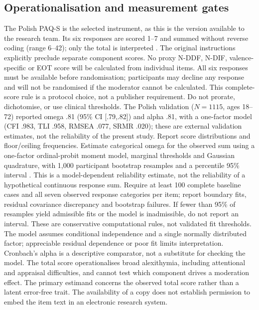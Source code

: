 \documentclass[11pt,a4paper]{article}
\begin{document}
\subsection{Operationalisation and measurement gates}
The Polish PAQ-S is the selected instrument, as this is the version available to the research team. Its six responses are scored 1--7 and summed without reverse coding (range 6--42); only the total is interpreted \parencite{preece2023,larionow2023,paqshortpl2023}. The original instructions explicitly preclude separate component scores. No proxy N-DDF, N-DIF, valence-specific or EOT score will be calculated from individual items. All six responses must be available before randomisation; participants may decline any response and will not be randomised if the moderator cannot be calculated. This complete-score rule is a protocol choice, not a publisher requirement. Do not prorate, dichotomise, or use clinical thresholds. The Polish validation (\(N=1115\), ages 18--72) reported omega .81 (95\% CI [.79,.82]) and alpha .81, with a one-factor model (CFI .983, TLI .958, RMSEA .077, SRMR .020); these are external validation estimates, not the reliability of the present study. Report score distributions and floor/ceiling frequencies. Estimate categorical omega for the observed sum using a one-factor ordinal-probit moment model, marginal thresholds and Gaussian quadrature, with 1,000 participant bootstrap resamples and a percentile 95\% interval \parencite{green2009,flora2020}. This is a model-dependent reliability estimate, not the reliability of a hypothetical continuous response sum. Require at least 100 complete baseline cases and all seven observed response categories per item; report boundary fits, residual covariance discrepancy and bootstrap failures. If fewer than 95\% of resamples yield admissible fits or the model is inadmissible, do not report an interval. These are conservative computational rules, not validated fit thresholds. The model assumes conditional independence and a single normally distributed factor; appreciable residual dependence or poor fit limits interpretation. Cronbach's alpha is a descriptive comparator, not a substitute for checking the model. The total score operationalises broad alexithymia, including attentional and appraisal difficulties, and cannot test which component drives a moderation effect. The primary estimand concerns the observed total score rather than a latent error-free trait. The availability of a copy does not establish permission to embed the item text in an electronic research system.
\end{document}
